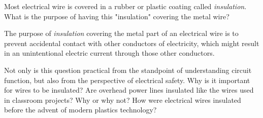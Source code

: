 

Most electrical wire is covered in a rubber or plastic coating called {\it insulation}.  What is the purpose of having this "insulation" covering the metal wire?







The purpose of {\it insulation} covering the metal part of an electrical wire is to prevent accidental contact with other conductors of electricity, which might result in an unintentional electric current through those other conductors.







Not only is this question practical from the standpoint of understanding circuit function, but also from the perspective of electrical safety.  Why is it important for wires to be insulated?  Are overhead power lines insulated like the wires used in classroom projects?  Why or why not?  How were electrical wires insulated before the advent of modern plastics technology?





